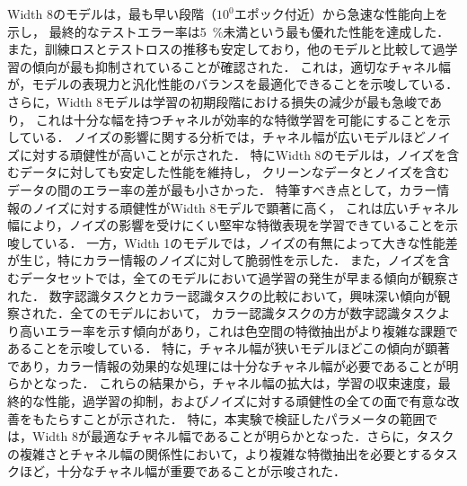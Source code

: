 Width 8のモデルは，最も早い段階（$10^0$エポック付近）から急速な性能向上を示し，
最終的なテストエラー率は\SI{5}{\percent}未満という最も優れた性能を達成した．
また，訓練ロスとテストロスの推移も安定しており，他のモデルと比較して過学習の傾向が最も抑制されていることが確認された．
これは，適切なチャネル幅が，モデルの表現力と汎化性能のバランスを最適化できることを示唆している．
さらに，Width 8モデルは学習の初期段階における損失の減少が最も急峻であり，
これは十分な幅を持つチャネルが効率的な特徴学習を可能にすることを示している．
ノイズの影響に関する分析では，チャネル幅が広いモデルほどノイズに対する頑健性が高いことが示された．
特にWidth 8のモデルは，ノイズを含むデータに対しても安定した性能を維持し，
クリーンなデータとノイズを含むデータの間のエラー率の差が最も小さかった．
特筆すべき点として，カラー情報のノイズに対する頑健性がWidth 8モデルで顕著に高く，
これは広いチャネル幅により，ノイズの影響を受けにくい堅牢な特徴表現を学習できていることを示唆している．
一方，Width 1のモデルでは，ノイズの有無によって大きな性能差が生じ，特にカラー情報のノイズに対して脆弱性を示した．
また，ノイズを含むデータセットでは，全てのモデルにおいて過学習の発生が早まる傾向が観察された．
数字認識タスクとカラー認識タスクの比較において，興味深い傾向が観察された．全てのモデルにおいて，
カラー認識タスクの方が数字認識タスクより高いエラー率を示す傾向があり，これは色空間の特徴抽出がより複雑な課題であることを示唆している．
特に，チャネル幅が狭いモデルほどこの傾向が顕著であり，カラー情報の効果的な処理には十分なチャネル幅が必要であることが明らかとなった．
これらの結果から，チャネル幅の拡大は，学習の収束速度，最終的な性能，過学習の抑制，およびノイズに対する頑健性の全ての面で有意な改善をもたらすことが示された．
特に，本実験で検証したパラメータの範囲では，Width 8が最適なチャネル幅であることが明らかとなった．さらに，タスクの複雑さとチャネル幅の関係性において，より複雑な特徴抽出を必要とするタスクほど，十分なチャネル幅が重要であることが示唆された．

